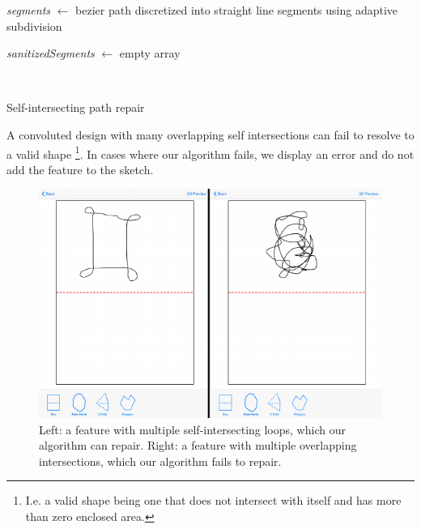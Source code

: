 \begin{algorithm}[H]

 \textit{segments} $\leftarrow$ bezier path discretized into straight line segments using adaptive subdivision 
 
 \textit{sanitizedSegments} $\leftarrow$ empty array
  
 
  \
 
\caption{Self-intersecting path repair}
\end{algorithm}

A convoluted design with many overlapping self intersections can fail to
resolve to a valid shape \footnote{I.e. a valid shape being one that
  does not intersect with itself and has more than zero enclosed area.}.
In cases where our algorithm fails, we display an error and do not add
the feature to the sketch.

\begin{figure}[htbp]
\centering
\includegraphics{figures/41_Tech_Tool_Implementation/succeedFailSelfIntersections.pdf}
\caption{Left: a feature with multiple self-intersecting loops, which
our algorithm can repair. Right: a feature with multiple overlapping
intersections, which our algorithm fails to repair.}
\end{figure}
